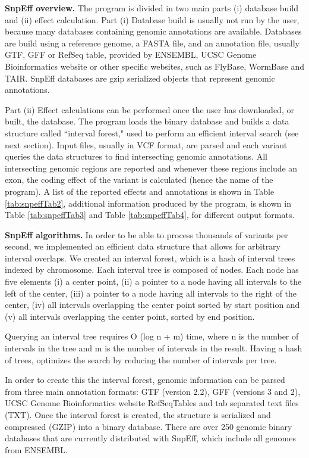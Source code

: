 \textbf{SnpEff overview.} The program is divided in two main parts (i) database build and (ii) effect calculation. Part (i) Database build is usually not run by the user, because many databases containing genomic annotations are available. Databases are build using a reference genome, a FASTA file, and an annotation file, usually GTF, GFF or RefSeq table, provided by ENSEMBL, UCSC Genome Bioinformatics website or other specific websites, such as FlyBase, WormBase and TAIR. SnpEff databases are gzip serialized objects that represent genomic annotations.

Part (ii) Effect calculations can be performed once the user has downloaded, or built, the database. The program loads the binary database and builds a data structure called ``interval forest," used to perform an efficient interval search (see next section). Input files, usually in VCF format, are parsed and each variant queries the data structures to find intersecting genomic annotations. All intersecting genomic regions are reported and whenever these regions include an exon, the coding effect of the variant is calculated (hence the name of the program). A list of the reported effects and annotations is shown in Table \ref{tab:snpeffTab2}, additional information produced by the program, is shown in Table \ref{tab:snpeffTab3} and Table \ref{tab:snpeffTab4}, for different output formats.

\textbf{SnpEff algorithms.} In order to be able to process thousands of variants per second, we implemented an efficient data structure that allows for arbitrary interval overlaps. We created an interval forest, which is a hash of interval trees indexed by chromosome.  Each interval tree \cite{cormen2001introduction} is composed of nodes. Each node has five elements (i) a center point, (ii) a pointer to a node having all intervals to the left of the center, (iii) a pointer to a node having all intervals to the right of the center, (iv) all intervals overlapping the center point sorted by start position and (v) all intervals overlapping the center point, sorted by end position.

Querying an interval tree requires O (log n + m) time, where n is the number of intervals in the tree and m is the number of intervals in the result. Having a hash of trees, optimizes the search by reducing the number of intervals per tree.

In order to create this the interval forest, genomic information can be parsed from three main annotation formats: GTF (version 2.2), GFF (versions 3 and 2), UCSC Genome Bioinformatics website RefSeqTables and tab separated text files (TXT). Once the interval forest is created, the structure is serialized and compressed (GZIP) into a binary database. There are over 250 genomic binary databases that are currently distributed with SnpEff, which include all genomes from ENSEMBL.

